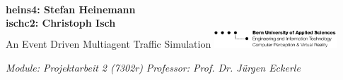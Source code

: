 
\begin{titlepage}
\\
\textbf{heins4: Stefan Heinemann}\\
\textbf{ischc2: Christoph Isch}\\
\newline\newline\newline\newline\newline
\newline\newline\newline
{\huge An Event Driven Multiagent Traffic Simulation}
\newline\newline\newline\newline\newline\newline
\newline\newline\newline\newline\newline\newline\newline\newline
\newline\newline\newline\newline\newline\newline\newline\newline
\newline\newline\newline\newline\newline\newline\newline\newline
\includegraphics[width=46mm]{images/logo_ti.png}\newline



\noindent\emph{Module: Projektarbeit 2 (7302r)}\newline
\emph{Professor: Prof. Dr. Jürgen Eckerle}

\end{titlepage}
